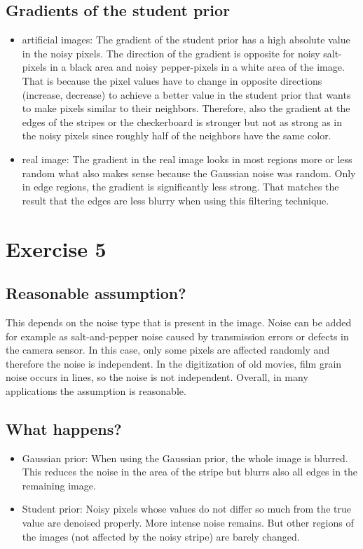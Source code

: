 \documentclass[a4paper,11pt, final]{scrartcl}
\begin{document}
\subsection*{Gradients of the student prior}
\begin{itemize}
\item artificial images: The gradient of the student prior has a high absolute value in the noisy pixels. The direction of the gradient is opposite for noisy salt-pixels in a black area and noisy pepper-pixels in a white area of the image. That is because the pixel values have to change in opposite directions (increase, decrease) to achieve a better value in the student prior that wants to make pixels similar to their neighbors. Therefore, also the gradient at the edges of the stripes or the checkerboard is stronger but not as strong as in the noisy pixels since roughly half of the neighbors have the same color.
\item real image: The gradient in the real image looks in most regions more or less random what also makes sense because the Gaussian noise was random. Only in edge regions, the gradient is significantly less strong. That matches the result that the edges are less blurry when using this filtering technique.  
\end{itemize}

\section*{Exercise 5}
\subsection*{Reasonable assumption?}
This depends on the noise type that is present in the image. Noise can be added for example as salt-and-pepper noise caused by transmission errors or defects in the camera sensor. In this case, only some pixels are affected randomly and therefore the noise is independent.
In the digitization of old movies, film grain noise occurs in lines, so the noise is not independent.
Overall, in many applications the assumption is reasonable.

\subsection*{What happens?}
\begin{itemize}
\item Gaussian prior: When using the Gaussian prior, the whole image is blurred. This reduces the noise in the area of the stripe but blurrs also all edges in the remaining image.
\item Student prior: Noisy pixels whose values do not differ so much from the true value are denoised properly. More intense noise remains. But other regions of the images (not affected by the noisy stripe) are barely changed.  
\end{itemize}
\end{document}
